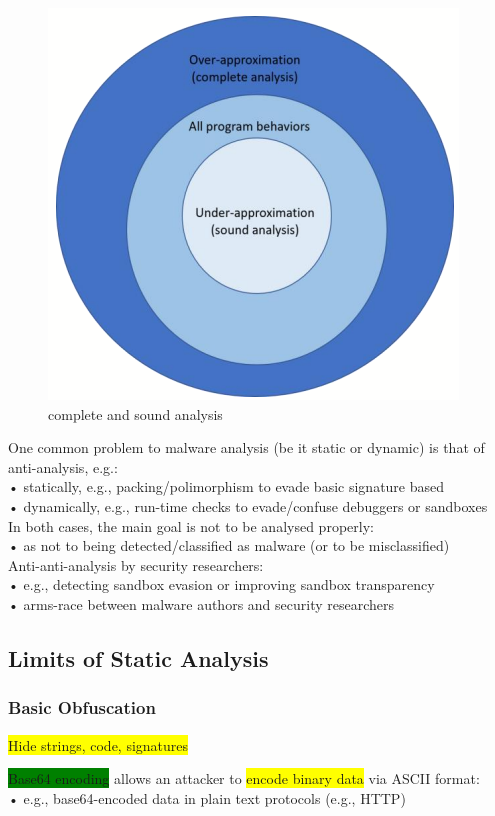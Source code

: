 \documentclass[]{project_plan}
\begin{document}
\begin{figure}
  \centering
  \includegraphics[width=.5\linewidth]{complete and sound analysis.png}
  \caption{complete and sound analysis}
\end{figure}

One common problem to malware analysis (be it static or dynamic) is that of anti-analysis, e.g.:\\
• statically, e.g., packing/polimorphism to evade basic signature based\\
• dynamically, e.g., run-time checks to evade/confuse debuggers or sandboxes\\

In both cases, the main goal is not to be analysed properly:\\
• as not to being detected/classified as malware (or to be misclassified)\\

Anti-anti-analysis by security researchers:\\
• e.g., detecting sandbox evasion or improving sandbox transparency\\
• arms-race between malware authors and security researchers

\subsection{Limits of Static Analysis}

\subsubsection{Basic Obfuscation}

\colorbox{yellow}{Hide strings, code, signatures}

\colorbox{green}{Base64 encoding} allows an attacker to \colorbox{yellow}{encode binary data} via ASCII format:\\
• e.g., base64-encoded data in plain text protocols (e.g., HTTP)\\
\end{document}
